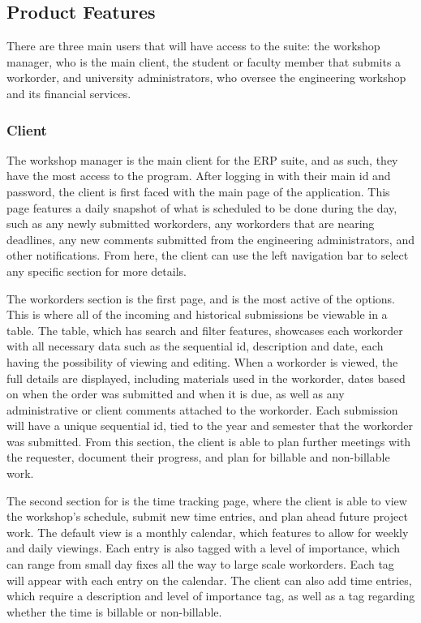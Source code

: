 {{{{{{{\subsection{Product Features}
There are three main users that will have access to the suite: the workshop manager, who is the main client, the student or faculty member that submits a workorder, and university administrators, who oversee the engineering workshop and its financial services. 

\subsubsection{Client}
The workshop manager is the main client for the ERP suite, and as such, they have the most access to the program. After logging in with their main id and password, the client is first faced with the main page of the application. This page features a daily snapshot of what is scheduled to be done during the day, such as any newly submitted workorders, any workorders that are nearing deadlines, any new comments submitted from the engineering administrators, and other notifications. From here, the client can use the left navigation bar to select any specific section for more details. 
\newline
{\setlength{\parindent}{0cm}

The workorders section is the first page, and is the most active of the options. This is where all of the incoming and historical submissions be viewable in a table. The table, which has search and filter features, showcases each workorder with all necessary data such as the sequential id, description and date, each having the possibility of viewing and editing. When a workorder is viewed, the full details are displayed, including materials used in the workorder, dates based on when the order was submitted and when it is due, as well as any administrative or client comments attached to the workorder. Each submission will have a unique sequential id, tied to the year and semester that the workorder was submitted. From this section, the client is able to plan further meetings with the requester, document their progress, and plan for billable and non-billable work. 
\newline
{\setlength{\parindent}{0cm}

The second section for is the time tracking page, where the client is able to view the workshop's schedule, submit new time entries, and plan ahead future project work. The default view is a monthly calendar, which features to allow for weekly and daily viewings. Each entry is also tagged with a level of importance, which can range from small day fixes all the way to large scale workorders. Each tag will appear with each entry on the calendar. The client can also add time entries, which require a description and level of importance tag, as well as a tag regarding whether the time  is billable or non-billable. 
\newline
{\setlength{\parindent}{0cm}

}}}}}}}}}}
